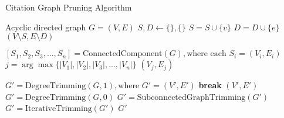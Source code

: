 \begin{algorithm}
\caption{Citation Graph Pruning Algorithm}
\begin{algorithmic}[1]
\Require Acyclic directed graph $G=(V, E)$
\State $S, D \gets \{\}, \{\}$
        $S = S \cup \{v\}$
    \EndIf
\EndFor
{}
            $D = D \cup \{e\}$
        \EndIf
    \EndFor
\EndFor
\State \Return $\left(V \setminus S, E \setminus D\right)$
\EndProcedure

    \State $\left[S_1, S_2, S_3,..., S_n \right] = \text{ConnectedComponent}(G), \text{where each } S_i = (V_i, E_i)$
    \State $j = \arg \max\{ |V_1|, |V_2|, |V_3|, ..., |V_n| \}$
    \State \Return $\left(V_j, E_j\right)$
\EndProcedure

        \State $G' = \text{DegreeTrimming}(G, 1), \text{where } G'=(V', E')$
            \State \textbf{break}
        \EndIf
    \EndWhile
    \State \Return $\left(V', E'\right)$
\EndProcedure
\State $G' = \text{DegreeTrimming}(G, 0)$ 
\State $G' = \text{SubconnectedGraphTrimming}(G')$ 
\State $G' = \text{IterativeTrimming}(G')$ 
\State \Return $G'$
\end{algorithmic}
\end{algorithm}
